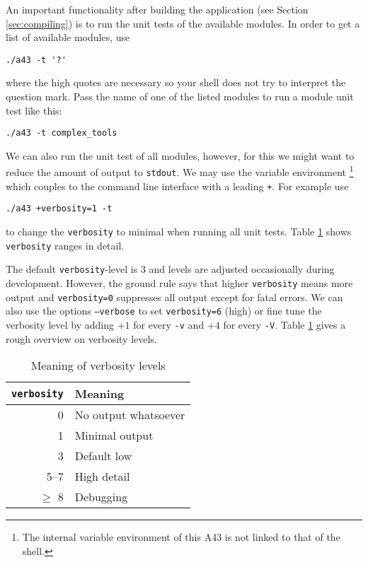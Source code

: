 \documentclass[oribibl]{llncs}
\newcommand{\ttt}[1]{\texttt{#1}}
\newcommand{\codename}{A43}
\begin{document}
An important functionality after building the application (see Section \ref{sec:compiling})
is to run the unit tests of the available modules.
In order to get a list of available modules, use 
\begin{verbatim}
./a43 -t '?'
\end{verbatim}
where the high quotes are necessary so your shell does not try to interpret the question mark.
Pass the name of one of the listed modules to run a module unit test like this:
\begin{verbatim}
./a43 -t complex_tools
\end{verbatim}
We can also run the unit test of all modules, however, for this we might want to reduce
the amount of output to \ttt{stdout}.
We may use the variable environment 
\footnote{The internal variable environment of this \codename{} is not linked to that of the shell.}
which couples to the command line interface with a leading \ttt{+}. For example use
\begin{verbatim}
./a43 +verbosity=1 -t
\end{verbatim}
to change the \ttt{verbosity} to minimal when running all unit tests. Table \ref{tab:verbosity-level-meaning} shows \ttt{verbosity} ranges in detail.


The default \ttt{verbosity}-level is $3$ and levels are adjusted occasionally during development.
However, the ground rule says that higher \ttt{verbosity} means more output
and \ttt{verbosity=0} suppresses all output except for fatal errors.
We can also use the options \ttt{--verbose} to set \ttt{verbosity=6} (high)
or fine tune the verbosity level by adding +$1$ for every \ttt{-v} and +$4$ for every \ttt{-V}.
Table \ref{tab:verbosity-level-meaning} gives a rough overview on verbosity levels. 

\begin{table}[ht!]
\caption[Meaning of verbosity levels]{
Meaning of verbosity levels
} \label{tab:verbosity-level-meaning}
\centering
\begin{tabular}{|r|l|}
\hline
  \ttt{verbosity} & Meaning   \\
\hline
     0 & No output whatsoever \\
     1 & Minimal output       \\
     3 & Default low          \\
  5--7 & High detail          \\
   $\geq$ 8 & Debugging       \\
\hline
\end{tabular}
\end{table}
\end{document}
